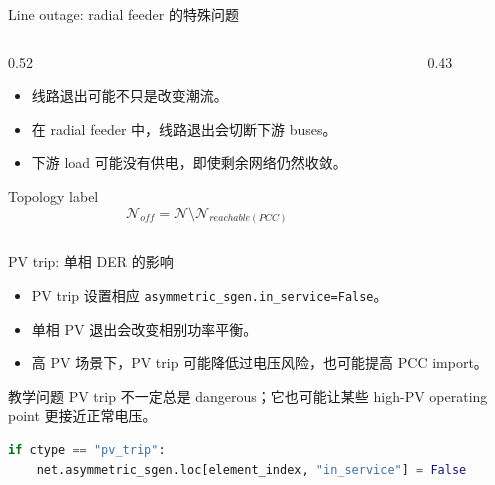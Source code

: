 \documentclass[aspectratio=169,11pt]{beamer}
\begin{document}
\begin{frame}{Line outage: radial feeder 的特殊问题}
\begin{columns}
\begin{column}{0.52\textwidth}
\begin{itemize}
  \item 线路退出可能不只是改变潮流。
  \item 在 radial feeder 中，线路退出会切断下游 buses。
  \item 下游 load 可能没有供电，即使剩余网络仍然收敛。
\end{itemize}
\begin{block}{Topology label}
\[
\mathcal{N}_{off}=\mathcal{N}\setminus \mathcal{N}_{reachable(PCC)}
\]
\end{block}
\end{column}
\begin{column}{0.43\textwidth}
\centering
{}
\end{column}
\end{columns}
\end{frame}

\begin{frame}[fragile]{PV trip: 单相 DER 的影响}
\begin{itemize}
  \item PV trip 设置相应 \texttt{asymmetric\_sgen.in\_service=False}。
  \item 单相 PV 退出会改变相别功率平衡。
  \item 高 PV 场景下，PV trip 可能降低过电压风险，也可能提高 PCC import。
\end{itemize}
\begin{block}{教学问题}
PV trip 不一定总是 dangerous；它也可能让某些 high-PV operating point 更接近正常电压。
\end{block}
\begin{lstlisting}[language=Python]
if ctype == "pv_trip":
    net.asymmetric_sgen.loc[element_index, "in_service"] = False
\end{lstlisting}
\end{frame}
\end{document}
